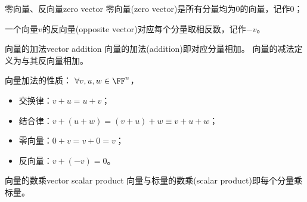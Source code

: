 \begin{definition}{零向量、反向量}{zero vector}
	零向量(zero vector)是所有分量均为0的向量，记作0；
	
	一个向量$v$的反向量(opposite vector)对应每个分量取相反数，记作$-v$。
\end{definition}


\begin{definition}{向量的加法}{vector addition}
	向量的加法(addition)即对应分量相加。
	向量的减法定义为与其反向量相加。
\end{definition}

\begin{corollary}
	向量加法的性质：%
	$\forall v,u,w\in\FF^n$，
    \begin{itemize}
    	\item 交换律：$v+u=u+v$；
    	\item 结合律：$v+(u+w)=(v+u)+w\equiv v+u+w$；
    	\item 零向量：$0+v=v+0=v$；
    	\item 反向量：$v+(-v)=0$。
    \end{itemize}
\end{corollary}

\begin{definition}{向量的数乘}{vector scalar product}
	向量与标量的数乘(scalar product)即每个分量乘标量。
\end{definition}

